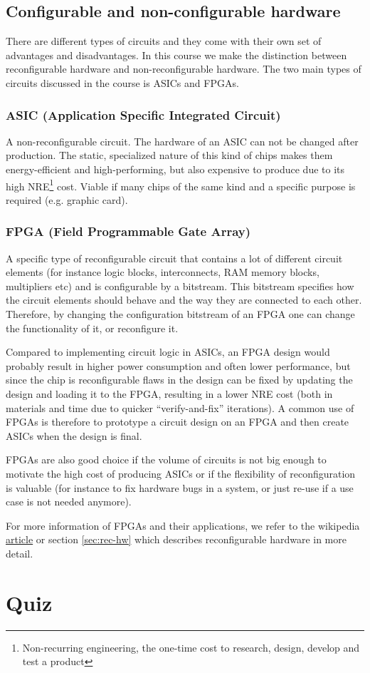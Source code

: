 \documentclass{article}
\begin{document}
\subsection{Configurable and non-configurable hardware}
There are different types of circuits and they come with their own set
of advantages and disadvantages. In this course we make the
distinction between reconfigurable hardware and non-reconfigurable
hardware. The two main types of circuits discussed in the course is
ASICs and FPGAs.

\subsubsection{ASIC (Application Specific Integrated Circuit)}
A non-reconfigurable circuit. The hardware of an ASIC can not be
changed after production. The static, specialized nature of this kind
of chips makes them energy-efficient and high-performing, but also
expensive to produce due to its high NRE\footnote{Non-recurring
  engineering, the one-time cost to research, design, develop and test
  a product} cost. Viable if many chips of the same kind and a
specific purpose is required (e.g. graphic card).

\subsubsection{FPGA (Field Programmable Gate Array)}
A specific type of reconfigurable circuit that contains a lot of
different circuit elements (for instance logic blocks, interconnects,
RAM memory blocks, multipliers etc) and is configurable by a
bitstream. This bitstream specifies how the circuit elements should
behave and the way they are connected to each other. Therefore, by
changing the configuration bitstream of an FPGA one can change the
functionality of it, or reconfigure it.

Compared to implementing circuit logic in ASICs, an FPGA design would
probably result in higher power consumption and often lower
performance, but since the chip is reconfigurable flaws in the design
can be fixed by updating the design and loading it to the FPGA,
resulting in a lower NRE cost (both in materials and time due to
quicker ``verify-and-fix'' iterations). A common use of FPGAs is
therefore to prototype a circuit design on an FPGA and then create
ASICs when the design is final.

FPGAs are also good choice if the volume of circuits is not big enough
to motivate the high cost of producing ASICs or if the flexibility of
reconfiguration is valuable (for instance to fix hardware bugs in a
system, or just re-use if a use case is not needed anymore).

For more information of FPGAs and their applications, we refer to the
wikipedia
\href{https://en.wikipedia.org/wiki/Field-programmable_gate_array#Applications}{article}
or section \ref{sec:rec-hw} which describes reconfigurable hardware in
more detail.
\section{Quiz}
\end{document}
